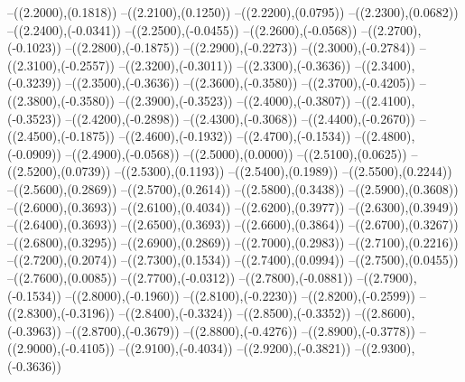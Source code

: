 {	--({\sx*(2.2000)},{\sy*(0.1818)})
	--({\sx*(2.2100)},{\sy*(0.1250)})
	--({\sx*(2.2200)},{\sy*(0.0795)})
	--({\sx*(2.2300)},{\sy*(0.0682)})
	--({\sx*(2.2400)},{\sy*(-0.0341)})
	--({\sx*(2.2500)},{\sy*(-0.0455)})
	--({\sx*(2.2600)},{\sy*(-0.0568)})
	--({\sx*(2.2700)},{\sy*(-0.1023)})
	--({\sx*(2.2800)},{\sy*(-0.1875)})
	--({\sx*(2.2900)},{\sy*(-0.2273)})
	--({\sx*(2.3000)},{\sy*(-0.2784)})
	--({\sx*(2.3100)},{\sy*(-0.2557)})
	--({\sx*(2.3200)},{\sy*(-0.3011)})
	--({\sx*(2.3300)},{\sy*(-0.3636)})
	--({\sx*(2.3400)},{\sy*(-0.3239)})
	--({\sx*(2.3500)},{\sy*(-0.3636)})
	--({\sx*(2.3600)},{\sy*(-0.3580)})
	--({\sx*(2.3700)},{\sy*(-0.4205)})
	--({\sx*(2.3800)},{\sy*(-0.3580)})
	--({\sx*(2.3900)},{\sy*(-0.3523)})
	--({\sx*(2.4000)},{\sy*(-0.3807)})
	--({\sx*(2.4100)},{\sy*(-0.3523)})
	--({\sx*(2.4200)},{\sy*(-0.2898)})
	--({\sx*(2.4300)},{\sy*(-0.3068)})
	--({\sx*(2.4400)},{\sy*(-0.2670)})
	--({\sx*(2.4500)},{\sy*(-0.1875)})
	--({\sx*(2.4600)},{\sy*(-0.1932)})
	--({\sx*(2.4700)},{\sy*(-0.1534)})
	--({\sx*(2.4800)},{\sy*(-0.0909)})
	--({\sx*(2.4900)},{\sy*(-0.0568)})
	--({\sx*(2.5000)},{\sy*(0.0000)})
	--({\sx*(2.5100)},{\sy*(0.0625)})
	--({\sx*(2.5200)},{\sy*(0.0739)})
	--({\sx*(2.5300)},{\sy*(0.1193)})
	--({\sx*(2.5400)},{\sy*(0.1989)})
	--({\sx*(2.5500)},{\sy*(0.2244)})
	--({\sx*(2.5600)},{\sy*(0.2869)})
	--({\sx*(2.5700)},{\sy*(0.2614)})
	--({\sx*(2.5800)},{\sy*(0.3438)})
	--({\sx*(2.5900)},{\sy*(0.3608)})
	--({\sx*(2.6000)},{\sy*(0.3693)})
	--({\sx*(2.6100)},{\sy*(0.4034)})
	--({\sx*(2.6200)},{\sy*(0.3977)})
	--({\sx*(2.6300)},{\sy*(0.3949)})
	--({\sx*(2.6400)},{\sy*(0.3693)})
	--({\sx*(2.6500)},{\sy*(0.3693)})
	--({\sx*(2.6600)},{\sy*(0.3864)})
	--({\sx*(2.6700)},{\sy*(0.3267)})
	--({\sx*(2.6800)},{\sy*(0.3295)})
	--({\sx*(2.6900)},{\sy*(0.2869)})
	--({\sx*(2.7000)},{\sy*(0.2983)})
	--({\sx*(2.7100)},{\sy*(0.2216)})
	--({\sx*(2.7200)},{\sy*(0.2074)})
	--({\sx*(2.7300)},{\sy*(0.1534)})
	--({\sx*(2.7400)},{\sy*(0.0994)})
	--({\sx*(2.7500)},{\sy*(0.0455)})
	--({\sx*(2.7600)},{\sy*(0.0085)})
	--({\sx*(2.7700)},{\sy*(-0.0312)})
	--({\sx*(2.7800)},{\sy*(-0.0881)})
	--({\sx*(2.7900)},{\sy*(-0.1534)})
	--({\sx*(2.8000)},{\sy*(-0.1960)})
	--({\sx*(2.8100)},{\sy*(-0.2230)})
	--({\sx*(2.8200)},{\sy*(-0.2599)})
	--({\sx*(2.8300)},{\sy*(-0.3196)})
	--({\sx*(2.8400)},{\sy*(-0.3324)})
	--({\sx*(2.8500)},{\sy*(-0.3352)})
	--({\sx*(2.8600)},{\sy*(-0.3963)})
	--({\sx*(2.8700)},{\sy*(-0.3679)})
	--({\sx*(2.8800)},{\sy*(-0.4276)})
	--({\sx*(2.8900)},{\sy*(-0.3778)})
	--({\sx*(2.9000)},{\sy*(-0.4105)})
	--({\sx*(2.9100)},{\sy*(-0.4034)})
	--({\sx*(2.9200)},{\sy*(-0.3821)})
	--({\sx*(2.9300)},{\sy*(-0.3636)})
}
